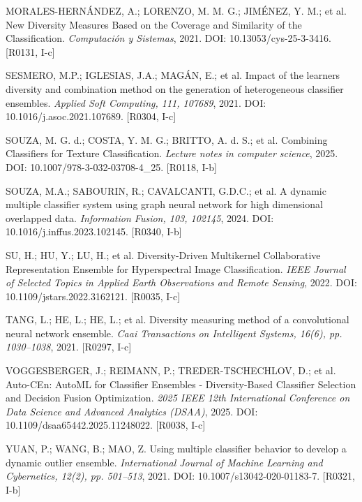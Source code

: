 \begin{description}
\item MORALES-HERNÁNDEZ, A.; LORENZO, M. M. G.; JIMÉNEZ, Y. M.; et al. New Diversity Measures Based on the Coverage and Similarity of the Classification. \emph{Computación y Sistemas}, 2021. DOI: 10.13053/cys-25-3-3416. [R0131, I-c]

\item SESMERO, M.P.; IGLESIAS, J.A.; MAGÁN, E.; et al. Impact of the learners diversity and combination method on the generation of heterogeneous classifier ensembles. \emph{Applied Soft Computing, 111, 107689}, 2021. DOI: 10.1016/j.asoc.2021.107689. [R0304, I-c]

\item SOUZA, M. G. d.; COSTA, Y. M. G.; BRITTO, A. d. S.; et al. Combining Classifiers for Texture Classification. \emph{Lecture notes in computer science}, 2025. DOI: 10.1007/978-3-032-03708-4\_25. [R0118, I-b]

\item SOUZA, M.A.; SABOURIN, R.; CAVALCANTI, G.D.C.; et al. A dynamic multiple classifier system using graph neural network for high dimensional overlapped data. \emph{Information Fusion, 103, 102145}, 2024. DOI: 10.1016/j.inffus.2023.102145. [R0340, I-b]

\item SU, H.; HU, Y.; LU, H.; et al. Diversity-Driven Multikernel Collaborative Representation Ensemble for Hyperspectral Image Classification. \emph{IEEE Journal of Selected Topics in Applied Earth Observations and Remote Sensing}, 2022. DOI: 10.1109/jstars.2022.3162121. [R0035, I-c]

\item TANG, L.; HE, L.; HE, L.; et al. Diversity measuring method of a convolutional neural network ensemble. \emph{Caai Transactions on Intelligent Systems, 16(6), pp. 1030--1038}, 2021. [R0297, I-c]

\item VOGGESBERGER, J.; REIMANN, P.; TREDER-TSCHECHLOV, D.; et al. Auto-CEn: AutoML for Classifier Ensembles - Diversity-Based Classifier Selection and Decision Fusion Optimization. \emph{2025 IEEE 12th International Conference on Data Science and Advanced Analytics (DSAA)}, 2025. DOI: 10.1109/dsaa65442.2025.11248022. [R0038, I-c]

\item YUAN, P.; WANG, B.; MAO, Z. Using multiple classifier behavior to develop a dynamic outlier ensemble. \emph{International Journal of Machine Learning and Cybernetics, 12(2), pp. 501--513}, 2021. DOI: 10.1007/s13042-020-01183-7. [R0321, I-b]
\end{description}
